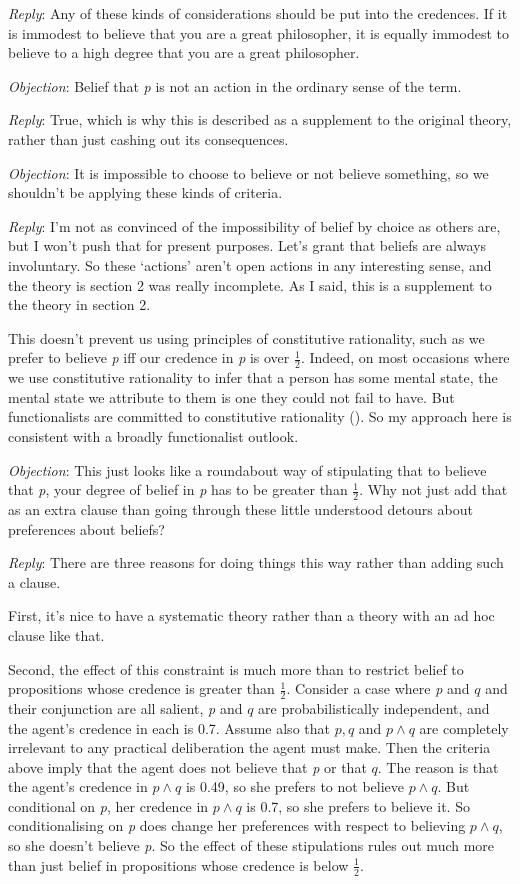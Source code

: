 \documentclass[
  11pt,
  letterpaper,
  DIV=11,
  numbers=noendperiod,
  oneside]{scrartcl}
\begin{document}
\emph{Reply}: Any of these kinds of considerations should be put into
the credences. If it is immodest to believe that you are a great
philosopher, it is equally immodest to believe to a high degree that you
are a great philosopher.

\emph{Objection}: Belief that \emph{p} is not an action in the ordinary
sense of the term.

\emph{Reply}: True, which is why this is described as a supplement to
the original theory, rather than just cashing out its consequences.

\emph{Objection}: It is impossible to choose to believe or not believe
something, so we shouldn't be applying these kinds of criteria.

\emph{Reply}: I'm not as convinced of the impossibility of belief by
choice as others are, but I won't push that for present purposes. Let's
grant that beliefs are always involuntary. So these `actions' aren't
open actions in any interesting sense, and the theory is section 2 was
really incomplete. As I said, this is a supplement to the theory in
section 2.

This doesn't prevent us using principles of constitutive rationality,
such as we prefer to believe \emph{p} iff our credence in \emph{p} is
over \(\frac{1}{2}\). Indeed, on most occasions where we use
constitutive rationality to infer that a person has some mental state,
the mental state we attribute to them is one they could not fail to
have. But functionalists are committed to constitutive rationality
(). So my approach here is
consistent with a broadly functionalist outlook.

\emph{Objection}: This just looks like a roundabout way of stipulating
that to believe that \emph{p}, your degree of belief in \emph{p} has to
be greater than \(\frac{1}{2}\). Why not just add that as an extra
clause than going through these little understood detours about
preferences about beliefs?

\emph{Reply}: There are three reasons for doing things this way rather
than adding such a clause.

First, it's nice to have a systematic theory rather than a theory with
an ad hoc clause like that.

Second, the effect of this constraint is much more than to restrict
belief to propositions whose credence is greater than \(\frac{1}{2}\).
Consider a case where \emph{p} and \(q\) and their conjunction are all
salient, \emph{p} and \(q\) are probabilistically independent, and the
agent's credence in each is 0.7. Assume also that \(p, q\) and
\(p \wedge q\) are completely irrelevant to any practical deliberation
the agent must make. Then the criteria above imply that the agent does
not believe that \emph{p} or that \(q\). The reason is that the agent's
credence in \(p \wedge q\) is 0.49, so she prefers to not believe
\(p \wedge q\). But conditional on \emph{p}, her credence in
\(p \wedge q\) is 0.7, so she prefers to believe it. So conditionalising
on \emph{p} does change her preferences with respect to believing
\(p \wedge q\), so she doesn't believe \emph{p}. So the effect of these
stipulations rules out much more than just belief in propositions whose
credence is below \(\frac{1}{2}\).
\end{document}
